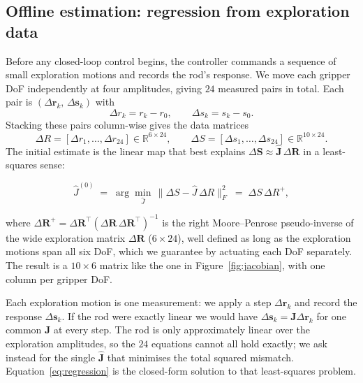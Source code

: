 \documentclass[11pt,a4paper]{article}
\begin{document}
\subsection{Offline estimation: regression from exploration data}
\label{sec:offline}

Before any closed-loop control begins, the controller commands a sequence of small
exploration motions and records the rod's response. We move each gripper DoF
independently at four amplitudes, giving $24$ measured pairs in total. Each pair is
$(\Delta\mathbf{r}_k,\,\Delta\mathbf{s}_k)$ with
\[
    \Delta r_k = r_k - r_0, \qquad \Delta s_k = s_k - s_0.
\]
Stacking these pairs column-wise gives the data matrices
\[
    \Delta R = [\Delta r_1, \dots, \Delta r_{24}] \in \mathbb{R}^{6 \times 24},
    \qquad
    \Delta S = [\Delta s_1, \dots, \Delta s_{24}] \in \mathbb{R}^{10 \times 24}.
\]
The initial estimate is the linear map that best explains $\Delta\mathbf{S} \approx \hat{\mathbf{J}}\,\Delta\mathbf{R}$
in a least-squares sense:
\begin{tcolorbox}[mathbox]
\begin{equation}
    \hat J^{(0)} \;=\; \arg\min_{\hat J}\, \|\Delta S - \hat J\,\Delta R\|_F^2
    \;=\; \Delta S\,\Delta R^{+},
    \label{eq:regression}
\end{equation}
\end{tcolorbox}
where $\Delta\mathbf{R}^{+} = \Delta\mathbf{R}^{\top}(\Delta\mathbf{R}\,\Delta\mathbf{R}^{\top})^{-1}$ is the right
Moore--Penrose pseudo-inverse of the wide exploration matrix $\Delta\mathbf{R}$ ($6\times 24$),
well defined as long as the exploration motions span all six DoF, which we guarantee by
actuating each DoF separately. The result is a $10\times 6$ matrix like the one in
Figure~\ref{fig:jacobian}, with one column per gripper DoF.

\begin{intuition}
Each exploration motion is one measurement: we apply a step $\Delta\mathbf{r}_k$ and record the
response $\Delta\mathbf{s}_k$. If the rod were exactly linear we would have
$\Delta\mathbf{s}_k = \mathbf{J}\Delta\mathbf{r}_k$ for one common $\mathbf{J}$ at every step. The rod is only
approximately linear over the exploration amplitudes, so the $24$ equations cannot all hold
exactly; we ask instead for the single $\hat{\mathbf{J}}$ that minimises the total squared
mismatch. Equation~\eqref{eq:regression} is the closed-form solution to that
least-squares problem.
\end{intuition}
\end{document}
